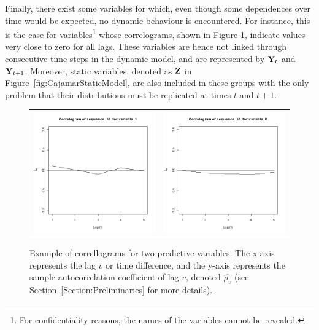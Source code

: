 Finally, there exist some variables for which, even though some dependences over time would be expected, no dynamic behaviour is encountered. For instance, this is the case for variables\footnote{For confidentiality reasons, the names of the variables cannot be revealed.} whose correlograms, shown in Figure \ref{fig:cajamarCorr}, indicate values very close to zero for all lags. These variables are hence not linked through consecutive time steps in the dynamic model, and are represented by ${\bf Y}_{t}$ and  ${\bf Y}_{t+1}$. Moreover, static variables, denoted as $\mathbf{Z}$ in Figure~\ref{fig:CajamarStaticModel}, are also included in these groups with the only problem that their distributions must be replicated at times $t$ and $t+1$. 


\begin{figure}[h]
  \centering
    \begin{tabular}{cc}
    \includegraphics[width=70mm]{figures/CajaMarcrl1}&
     \includegraphics[width=70mm]{figures/CajaMarcrl3}\\
  \end{tabular}
    \caption{\label{fig:cajamarCorr}Example of correllograms for two predictive variables.  The x-axis represents the lag $v$ or time difference, and the y-axis represents the sample autocorrelation coefficient of lag $v$, denoted $\hat{\rho_v}$ (see Section~\ref{Section:Preliminaries} for more details).}
\end{figure}

